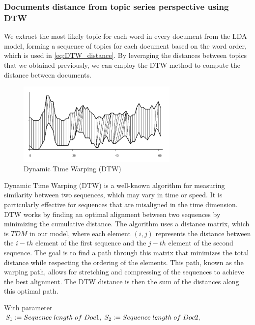 \documentclass[UTF8]{ctexart}
\begin{document}
\subsubsection{Documents distance from topic series perspective using DTW}
{
    We extract the most likely topic for each word in every document from the LDA model, 
    forming a sequence of topics for each document based on the word order, which is used in \eqref{eq:DTW_distance}.
    By leveraging the distances between topics that we obtained previously, 
    we can employ the DTW method to compute the distance between documents.

    \begin{figure}[htbp]
        \captionsetup{position=bottom, skip=8pt}
        \centering
        \includegraphics[width=0.7\textwidth]{DTW_1}
        \caption{Dynamic Time Warping (DTW)}
        \label{fig:DTW_1}
    \end{figure}

    Dynamic Time Warping (DTW) \cite{ref1} is a well-known algorithm for measuring similarity between two sequences, 
    which may vary in time or speed.
    It is particularly effective for sequences that are misaligned in the time dimension. 
    DTW works by finding an optimal alignment between two sequences by minimizing the cumulative distance. 
    The algorithm uses a distance matrix, which is $TDM$ in our model, where each element $(i, j)$ 
    represents the distance between the $i-th$ element of the first sequence and the $j-th$ element of the second sequence. 
    The goal is to find a path through this matrix that minimizes the total distance while respecting the ordering of the elements. 
    This path, known as the warping path, allows for stretching and compressing of the sequences to achieve the best alignment.
    The DTW distance is then the sum of the distances along this optimal path.

    With parameter $S_1 := Sequence \hspace{0.1cm} length \hspace{0.1cm} of \hspace{0.1cm} Doc1, \hspace{0.1cm} S_2 := Sequence \hspace{0.1cm} length \hspace{0.1cm} of \hspace{0.1cm} Doc2,$

}
\end{document}
